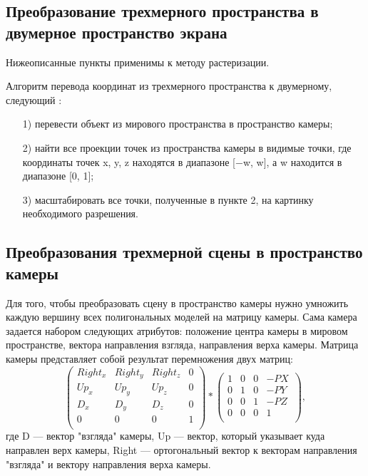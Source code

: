 \subsection{Преобразование трехмерного пространства в двумерное пространство экрана}
Нижеописанные пункты применимы к методу растеризации.

Алгоритм перевода координат из трехмерного пространства к двумерному, следующий \cite{Open}: 
\begin{enumerate}
	\item[1)] перевести объект из мирового пространства в пространство камеры;
	\item[2)] найти все проекции точек из пространства камеры в видимые точки, где координаты точек x, y, z находятся в диапазоне [−w, w], а w находится в диапазоне [0, 1];
	\item[3)] масштабировать все точки, полученные в пункте 2, на картинку необходимого разрешения. 
\end{enumerate}

\subsection{Преобразования трехмерной сцены в пространство камеры}
Для того, чтобы преобразовать сцену в пространство камеры нужно умножить каждую вершину всех полигональных моделей на матрицу
камеры. Сама камера задается набором следующих атрибутов: положение
центра камеры в мировом пространстве, вектора направления взгляда, направления верха камеры.
Матрица камеры представляет собой результат перемножения двух матриц:
\begin{equation}
	\label{eq:Cam}
	 \begin{pmatrix}
		Right_{x} & Right_{y} & Right_{z} & 0 \\
		Up_{x} & Up_{y} & Up_{z}  & 0 \\
		D_{x} & D_{y} & D_{z} & 0 \\
		0 & 0 & 0 & 1 \\
	\end{pmatrix} *  
\begin{pmatrix}
	1 & 0 & 0 & -PX \\
	0 & 1 & 0  & -PY \\
	0 & 0 & 1 & -PZ\ \\
	0 & 0 & 0 & 1 \\
\end{pmatrix},
\end{equation}
где D --- вектор "взгляда" камеры, Up --- вектор, который указывает куда направлен верх камеры, Right --- ортогональный вектор к векторам направления "взгляда" и вектору направления верха камеры.
